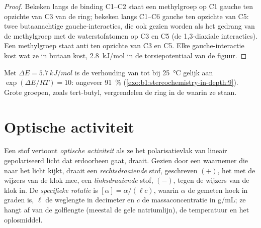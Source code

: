 \begin{proof}
Bekeken langs de binding C1--C2 staat een  methylgroep op C1 gauche
ten opzichte van C3 van de ring; bekeken langs C1--C6 gauche ten opzichte
van C5: twee butaanachtige gauche-interacties, die ook gezien worden als
het gedrang van de methylgroep met de  waterstofatomen op C3 en C5
(de 1,3-diaxiale interacties). Een  methylgroep staat anti ten
opzichte van C3 en C5. Elke gauche-interactie kost wat ze in butaan kost,
\qty{2.8}{kJ/mol} in de torsiepotentiaal van de figuur.
\end{proof}

Met $\Delta E = \qty{5.7}{kJ/mol}$ is de verhouding van  tot
  bij \qty{25}{\celsius} gelijk aan $\exp(\Delta E/RT) = 10$:
ongeveer \qty{91}{\percent} 
(\cref{exo:b1:stereochemistry-in-depth:9}). Grote groepen, zoals
tert-butyl, vergrendelen de ring in de  waarin ze  staan.

\section{Optische activiteit}

\begin{definition}\label{def:b1:stereochemistry-in-depth:optical-activity}
Een stof vertoont \emph{optische activiteit}
als ze het polarisatievlak van lineair gepolariseerd licht dat erdoorheen
gaat, draait. Gezien door een waarnemer die naar het licht kijkt, draait
een \emph{rechtsdraaiende} stof, geschreven $(+)$,
het met de wijzers van de klok mee, een
\emph{linksdraaiende} stof, $(-)$, tegen de wijzers
van de klok in. De \emph{specifieke rotatie}
is $[\alpha] = \alpha/(\ell c)$, waarin $\alpha$ de gemeten
hoek in graden is, $\ell$ de weglengte in decimeter en $c$ de
massaconcentratie in \unit{g/mL}; ze hangt af van de golflengte (meestal
de gele natriumlijn), de temperatuur en het oplosmiddel.
\end{definition}

